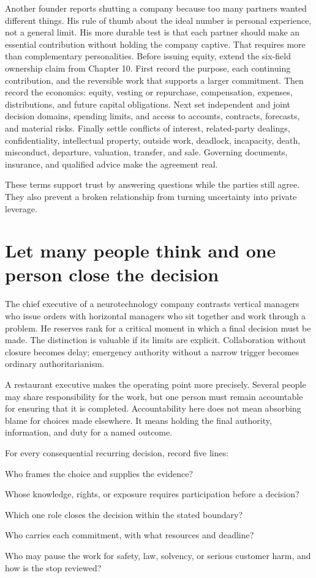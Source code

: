 Another founder reports shutting a company because too many partners wanted
different things. His rule of thumb about the ideal number is personal
experience, not a general limit. His more durable test is that each partner
should make an essential contribution without holding the company captive.
That requires more than complementary personalities. Before issuing equity,
extend the six-field ownership claim from Chapter 10. First record the purpose,
each continuing contribution, and the reversible work that supports a larger
commitment. Then record the economics: equity, vesting or repurchase,
compensation, expenses, distributions, and future capital obligations. Next
set independent and joint decision domains, spending limits, and access to
accounts, contracts, forecasts, and material risks. Finally settle conflicts
of interest, related-party dealings, confidentiality, intellectual property,
outside work, deadlock, incapacity, death, misconduct, departure, valuation,
transfer, and sale. Governing documents, insurance, and qualified advice make
the agreement real.

These terms support trust by answering questions while the parties still
agree. They also prevent a broken relationship from turning uncertainty into
private leverage.

\section{Let many people think and one person close the decision}

The chief executive of a neurotechnology company contrasts vertical managers
who issue orders with horizontal managers who sit together and work through a
problem. He reserves rank for a critical moment in which a final decision must
be made. The distinction is valuable if its limits are explicit. Collaboration
without closure becomes delay; emergency authority without a narrow trigger
becomes ordinary authoritarianism.

A restaurant executive makes the operating point more precisely. Several
people may share responsibility for the work, but one person must remain
accountable for ensuring that it is completed. Accountability here does not
mean absorbing blame for choices made elsewhere. It means holding the final
authority, information, and duty for a named outcome.

For every consequential recurring decision, record five lines:

\begin{description}[leftmargin=2.75em,style=nextline]
\item[Propose] Who frames the choice and supplies the evidence?
\item[Consult] Whose knowledge, rights, or exposure requires participation
  before a decision?
\item[Decide] Which one role closes the decision within the stated boundary?
\item[Execute] Who carries each commitment, with what resources and deadline?
\item[Stop] Who may pause the work for safety, law, solvency, or serious customer
  harm, and how is the stop reviewed?
\end{description}

